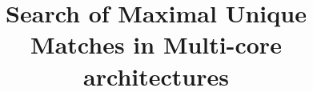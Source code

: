 \documentclass{acm_proc_article-sp}
\begin{document}
\title{Search of Maximal Unique Matches in Multi-core architectures}
%
%
%
%
%
\end{document}
